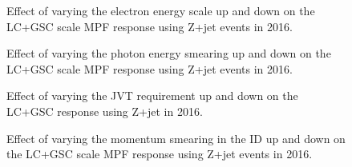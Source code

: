 \begin{figure}[!ht]
  \begin{center}
  \end{center}
  \caption[Effect of Egamma scale uncertainty on LC scale response with Z+jet]
  {Effect of varying the electron energy scale up and down on the LC+GSC scale MPF response using Z+jet events in 2016.}
  \label{plot:ZJetLC2016EGScaleApp}
\end{figure}

\begin{figure}[!ht]
  \begin{center}
  \end{center}
  \caption[Egamma resolution uncertainty on LC scale response with Z+jet]
{Effect of varying the photon energy smearing up and down on the LC+GSC scale MPF response using Z+jet events in 2016.}
  \label{plot:ZJetLC2016EGResolutionApp}
\end{figure}


\begin{figure}[!ht]
  \begin{center}
  \end{center}
  \caption[JVT uncertainty, LC+GSC scale with 2016 Z+jet]
  {Effect of varying the JVT requirement up and down on the LC+GSC response using Z+jet in 2016.}
  \label{plot:ZJetLC2016JVTApp}
\end{figure}

\begin{figure}[!ht]
  \begin{center}
  \end{center}
  \caption[Muon ID uncertainty, LC+GSC scale with 2016 Z+jet]
  {Effect of varying the momentum smearing in the ID up and down on the LC+GSC scale MPF response using Z+jet events in 2016. }
  \label{plot:ZJetLC2016nIDpp}
\end{figure}


